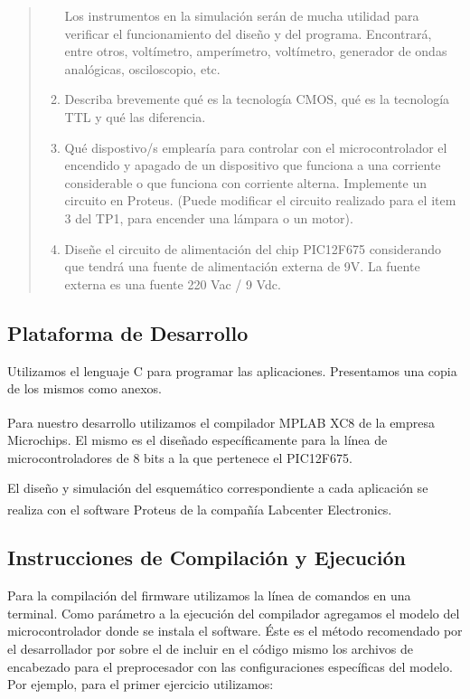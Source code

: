 \documentclass[a4paper]{article}
\let\originalcite\cite
\renewcommand{\cite}[2][]{\textsuperscript{\originalcite{#2}}}
\begin{document}
\begin{quotation}
\begin{enumerate}
{            Los instrumentos en la simulación serán de mucha utilidad 
            para verificar el funcionamiento del diseño y del programa. 
            Encontrará, entre otros, voltímetro, amperímetro, 
            voltímetro, generador de ondas analógicas, osciloscopio, 
            etc.
        }
        \item{
            Describa brevemente qué es la tecnología CMOS, qué es la 
            tecnología TTL y qué las diferencia.
        }
        \item{
            Qué dispostivo/s emplearía para controlar con el 
            microcontrolador el encendido y apagado de un dispositivo 
            que funciona a una corriente considerable o que funciona 
            con corriente alterna. Implemente un circuito en Proteus. 
            (Puede modificar el circuito realizado para el item 3 del 
            TP1, para encender una lámpara o un motor).
        }
        \item{
            Diseñe el circuito de alimentación del chip PIC12F675 
            considerando que tendrá una fuente de alimentación externa 
            de 9V. La fuente externa es una fuente 220 Vac / 9 Vdc.
        } 
    \end{enumerate}
\end{quotation}

\subsection{Plataforma de Desarrollo}

Utilizamos el lenguaje C para programar las aplicaciones. Presentamos
una copia de los mismos como anexos.

Para nuestro desarrollo utilizamos el compilador MPLAB 
XC8\cite{bib:compilador} de la empresa Microchips. El mismo es el 
diseñado específicamente para la línea de microcontroladores de 8 bits
a la que pertenece el PIC12F675.

El diseño y simulación del esquemático correspondiente a cada 
aplicación se realiza con el software Proteus\cite{bib:simulador} de 
la compañía Labcenter Electronics.

\subsection{Instrucciones de Compilación y Ejecución}

Para la compilación del firmware utilizamos la línea de comandos en 
una terminal. Como parámetro a la ejecución del compilador agregamos
el modelo del microcontrolador donde se instala el software. Éste es 
el método recomendado por el desarrollador por sobre el de incluir en 
el código mismo los archivos de encabezado para el preprocesador con 
las configuraciones específicas del modelo. Por ejemplo, para el 
primer ejercicio utilizamos:
\end{document}
